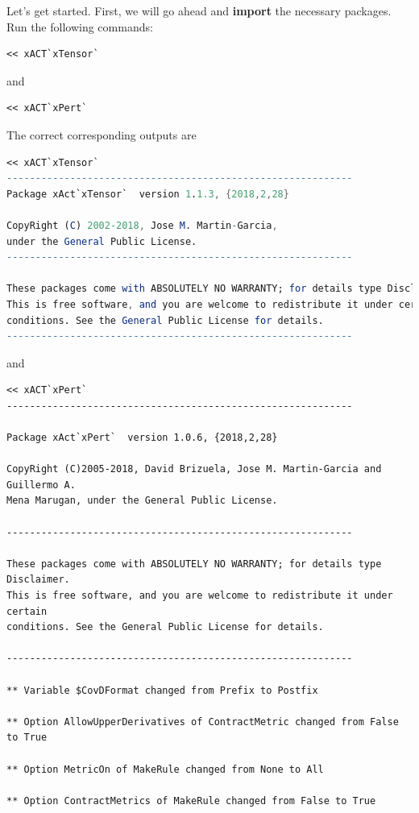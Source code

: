 \documentclass{book}
\theoremstyle{definition}
\begin{document}
Let's get started. First, we will go ahead and \textbf{import} the necessary packages. Run the following commands:
\begin{lstlisting}
<< xACT`xTensor`
\end{lstlisting}
and
\begin{lstlisting}
<< xACT`xPert`
\end{lstlisting}
The correct corresponding outputs are
\begin{lstlisting}[language=mathematica]
<< xACT`xTensor`
------------------------------------------------------------
Package xAct`xTensor`  version 1.1.3, {2018,2,28}

CopyRight (C) 2002-2018, Jose M. Martin-Garcia, 
under the General Public License.
------------------------------------------------------------

These packages come with ABSOLUTELY NO WARRANTY; for details type Disclaimer. 
This is free software, and you are welcome to redistribute it under certain 
conditions. See the General Public License for details.
------------------------------------------------------------
\end{lstlisting}
and
\begin{lstlisting}
<< xACT`xPert`
------------------------------------------------------------

Package xAct`xPert`  version 1.0.6, {2018,2,28}

CopyRight (C)2005-2018, David Brizuela, Jose M. Martin-Garcia and Guillermo A.
Mena Marugan, under the General Public License.

------------------------------------------------------------

These packages come with ABSOLUTELY NO WARRANTY; for details type Disclaimer. 
This is free software, and you are welcome to redistribute it under certain 
conditions. See the General Public License for details.

------------------------------------------------------------

** Variable $CovDFormat changed from Prefix to Postfix

** Option AllowUpperDerivatives of ContractMetric changed from False to True

** Option MetricOn of MakeRule changed from None to All

** Option ContractMetrics of MakeRule changed from False to True

\end{lstlisting}
\end{document}
